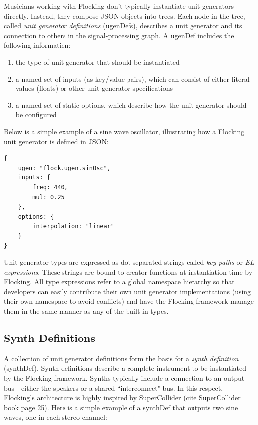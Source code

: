 \documentclass{article}
\begin{document}
Musicians working with Flocking don't typically instantiate unit generators directly. Instead, they compose JSON objects into trees. Each node in the tree, called {\it unit generator definitions} (ugenDefs), describes a unit generator and its connection to others in the signal-processing graph. A ugenDef includes the following information:

\begin{enumerate}
\item the type of unit generator that should be instantiated
\item a named set of inputs (as key/value pairs), which can consist of either literal values (floats) or other unit generator specifications
\item a named set of static options, which describe how the unit generator should be configured
\end{enumerate}

Below is a simple example of a sine wave oscillator, illustrating how a Flocking unit generator is defined in JSON:

\begin{verbatim}
{
    ugen: "flock.ugen.sinOsc",
    inputs: {
        freq: 440,
        mul: 0.25
    },
    options: {
        interpolation: "linear"
    }
}
\end{verbatim}

Unit generator types are expressed as dot-separated strings called {\it key paths} or {\it EL expressions}. These strings are bound to creator functions at instantiation time by Flocking. All type expressions refer to a global namespace hierarchy so that developers can easily contribute their own unit generator implementations (using their own namespace to avoid conflicts) and have the Flocking framework manage them in the same manner as any of the built-in types.

\subsection{Synth Definitions}

A collection of unit generator definitions form the basis for a {\it synth definition} (synthDef). Synth definitions describe a complete instrument to be instantiated by the Flocking framework. Synths typically include a connection to an output bus---either the speakers or a shared ``interconnect" bus. In this respect, Flocking's architecture is highly inspired by SuperCollider (cite SuperCollider book page 25). Here is a simple example of a synthDef that outputs two sine waves, one in each stereo channel:
\end{document}

